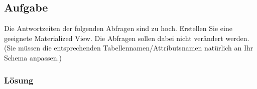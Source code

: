 \label{subsec:uebung_05.aufgabe_03}
\subsection{Aufgabe}
Die Antwortzeiten der folgenden Abfragen sind zu hoch. Erstellen Sie eine geeignete Materialized View. Die Abfragen sollen dabei nicht verändert werden. (Sie müssen die entsprechenden Tabellennamen/Attributsnamen natürlich an Ihr Schema anpassen.)

\subsubsection*{Lösung}
\label{subsubsec:uebung_05.aufgabe_03.loesung}















